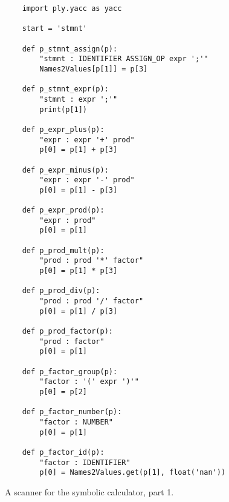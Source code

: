 \begin{figure}[!ht]
\centering
\begin{verbatim}
    import ply.yacc as yacc
    
    start = 'stmnt'
    
    def p_stmnt_assign(p):
        "stmnt : IDENTIFIER ASSIGN_OP expr ';'"
        Names2Values[p[1]] = p[3]
    
    def p_stmnt_expr(p):
        "stmnt : expr ';'"
        print(p[1])
    
    def p_expr_plus(p):
        "expr : expr '+' prod"
        p[0] = p[1] + p[3]
        
    def p_expr_minus(p):
        "expr : expr '-' prod"
        p[0] = p[1] - p[3]
        
    def p_expr_prod(p):
        "expr : prod"
        p[0] = p[1]
    
    def p_prod_mult(p):
        "prod : prod '*' factor"
        p[0] = p[1] * p[3]
        
    def p_prod_div(p):
        "prod : prod '/' factor"
        p[0] = p[1] / p[3]
        
    def p_prod_factor(p):
        "prod : factor"
        p[0] = p[1]
    
    def p_factor_group(p):
        "factor : '(' expr ')'"
        p[0] = p[2]
    
    def p_factor_number(p):
        "factor : NUMBER"
        p[0] = p[1]
    
    def p_factor_id(p):
        "factor : IDENTIFIER"
        p[0] = Names2Values.get(p[1], float('nan'))
\end{verbatim}
\vspace*{-0.3cm}
\caption{A scanner for the symbolic calculator, part 1.}
\label{fig:Symbolic-Calculator.ipynb:yacc}
\end{figure}

